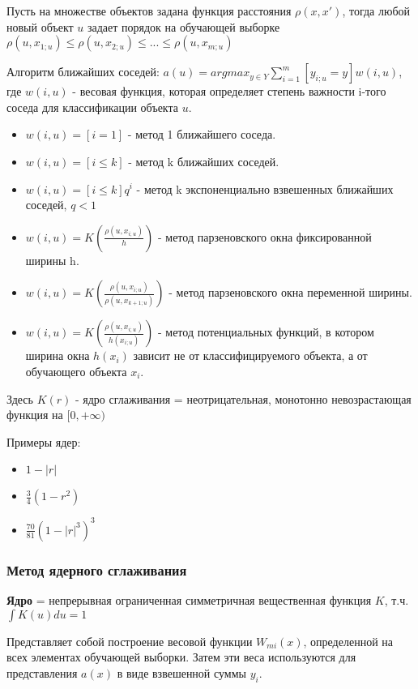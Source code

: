 \documentclass{article}
\begin{document}
Пусть на множестве объектов задана функция расстояния $\rho(x, x')$, тогда
любой новый объект $u$ задает порядок на обучающей выборке
$\rho(u, x_{1; u}) \leq \rho(u, x_{2; u}) \leq ... \leq \rho(u, x_{m; u})$

Алгоритм ближайших соседей: $a(u) = argmax_{y \in Y} \sum\limits_{i=1}^m
[y_{i;u} = y] w(i, u)$, где $w(i, u)$ - весовая функция, которая определяет
степень важности i-того соседа для классификации объекта $u$.

\begin{itemize}
	\item $w(i, u) = [i = 1]$ - метод 1 ближайшего соседа.
	\item $w(i, u) = [i \leq k]$ - метод k ближайших соседей.
	\item $w(i, u) = [i \leq k]q^i$ - метод k экспоненциально взвешенных ближайших соседей, $q < 1$
	\item $w(i, u) = K\left(\frac{\rho(u, x_{i; u})}{h}\right)$ - метод парзеновского окна фиксированной ширины h.
	\item $w(i, u) = K\left(\frac{\rho(u, x_{i; u})}{\rho(u, x_{k+1; u})}\right)$ -
	метод парзеновского окна переменной ширины.
	\item $w(i, u) = K\left(\frac{\rho(u, x_{i; u})}{h(x_{i; u})}\right)$ -
	метод потенциальных функций, в котором ширина окна $h(x_i)$ зависит не от
	классифицируемого объекта, а от обучающего объекта $x_i$.
\end{itemize}

Здесь $K(r)$ - ядро сглаживания = неотрицательная, монотонно невозрастающая функция на $[0, +\infty)$

Примеры ядер:
\begin{itemize}
	\item $1 - |r|$
	\item $\frac{3}{4}(1 - r^2)$
	\item $\frac{70}{81} (1 - |r|^3)^3$
\end{itemize}

\subsubsection{Метод ядерного сглаживания}

\textbf{Ядро} = непрерывная ограниченная симметричная вещественная функция
$K$, т.ч. $\int K (u) du = 1$

Представляет собой построение весовой функции $W_{mi} (x)$, определенной
на всех элементах обучающей выборки. Затем эти веса используются для
представления $a(x)$ в виде взвешенной суммы $y_i$.
\end{document}
